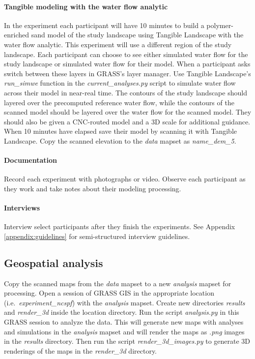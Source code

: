 \documentclass[prodmode,acmtochi]{acmsmall} %
\begin{document}
\paragraph{Tangible modeling with the water flow analytic}
In the  experiment
each participant will have 10 minutes to build 
a polymer-enriched sand model
of the study landscape 
using Tangible Landscape with the water flow analytic.
This experiment will use a different region of the study landscape. 
Each participant can choose to see either
simulated water flow for the study landscape
or simulated water flow for their model. 
When a participant asks
switch between these layers 
in GRASS's layer manager. 
Use Tangible Landscape's \emph{run{\_}simwe} function 
in the \emph{current{\_}analyses.py} script 
to simulate water flow across their model in near-real time.
The contours of the study landscape should layered
over the precomputed reference water flow, 
while the contours of the scanned model should be layered
over the water flow for the scanned model. 
They should also be given a CNC-routed model 
and a 3D scale for additional guidance. 
%
When 10 minutes have elapsed 
save their model by scanning it with Tangible Landscape.
Copy the scanned elevation to the \emph{data} mapset
as \emph{name{\_}dem{\_}5}.

\paragraph{Documentation}
Record each experiment with photographs or video.
Observe each participant as they work
and take notes about their modeling processing.

\paragraph{Interviews}
Interview select participants after they finish the experiments. 
See Appendix \ref{appendix:guidelines} for semi-structured interview guidelines.

\subsection{Geospatial analysis}\label{appendix:analysis}
Copy the scanned maps from the \emph{data} mapset 
to a new \emph{analysis} mapset for processing. 
Open a session of GRASS GIS 
in the appropriate location (i.e.~\emph{experiment{\_ncspf}}) 
with the \emph{analysis} mapset.
Create new directories \emph{results} and \emph{render\_3d} 
inside the location directory.
Run the script \emph{analysis.py} in this GRASS session to analyze the data. 
This will generate new maps with analyses and simulations in the \emph{analysis} mapset
and will render the maps as \emph{.png} images in the \emph{results} directory.
Then run the script \emph{render\_3d\_images.py} 
to generate 3D renderings of the maps in the \emph{render\_3d} directory.
\end{document}
